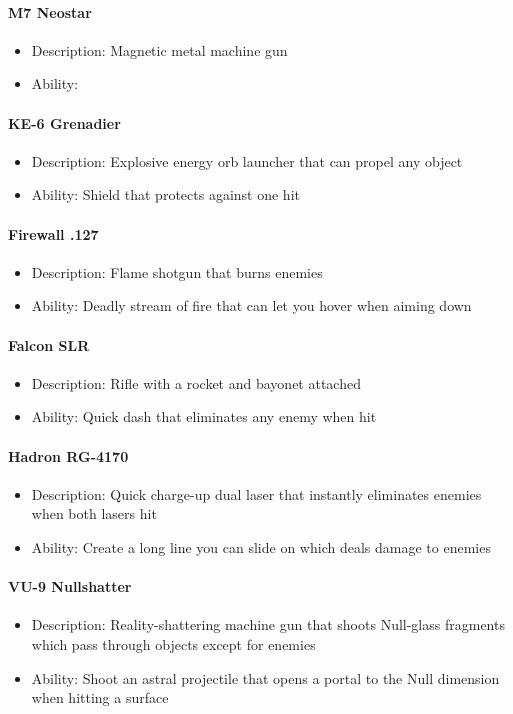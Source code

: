 \documentclass[../Main.tex]{subfiles}
\begin{document}
\paragraph{M7 Neostar}

\begin{itemize}
	\item Description: Magnetic metal machine gun
	\item Ability:
\end{itemize} 


\paragraph{KE-6 Grenadier}
 
\begin{itemize}
	\item Description: Explosive energy orb launcher that can propel any object
	\item Ability: Shield that protects against one hit
\end{itemize} 

\paragraph{Firewall .127}

\begin{itemize}
	\item Description: Flame shotgun that burns enemies
	\item Ability: Deadly stream of fire that can let you hover when aiming down
\end{itemize} 

\paragraph{Falcon SLR}

\begin{itemize}
	\item Description: Rifle with a rocket and bayonet attached
	\item Ability: Quick dash that eliminates any enemy when hit
\end{itemize} 


\paragraph{Hadron RG-4170}

\begin{itemize}
	\item Description: Quick charge-up dual laser that instantly eliminates enemies when both lasers hit
	\item Ability: Create a long line you can slide on which deals damage to enemies
\end{itemize} 


\paragraph{VU-9 Nullshatter}

\begin{itemize}
	\item Description: Reality-shattering machine gun that shoots Null-glass fragments which pass through objects except for enemies
	\item Ability: Shoot an astral projectile that opens a portal to the Null dimension when hitting a surface
\end{itemize} 
\end{document}
